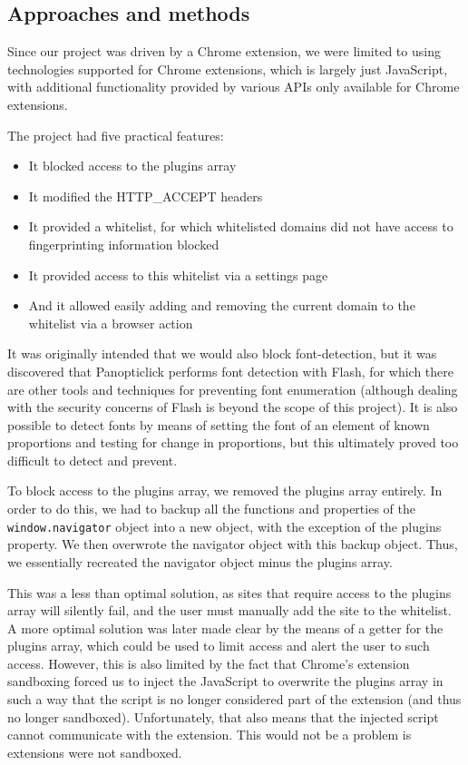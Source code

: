 \documentclass[12pt,a4paper]{article}
\begin{document}
\subsection{Approaches and methods}
Since our project was driven by a Chrome extension, we were limited to using technologies supported for Chrome extensions, which is largely just JavaScript, with additional functionality provided by various APIs only available for Chrome extensions.

The project had five practical features:
\begin{itemize}
	\item It blocked access to the plugins array
	\item It modified the HTTP\_ACCEPT headers
	\item It provided a whitelist, for which whitelisted domains did not have access to fingerprinting information blocked
	\item It provided access to this whitelist via a settings page
	\item And it allowed easily adding and removing the current domain to the whitelist via a browser action
\end{itemize}

It was originally intended that we would also block font-detection, but it was discovered that Panopticlick performs font detection with Flash, for which there are other tools and techniques for preventing font enumeration (although dealing with the security concerns of Flash is beyond the scope of this project). It is also possible to detect fonts by means of setting the font of an element of known proportions and testing for change in proportions, but this ultimately proved too difficult to detect and prevent.

To block access to the plugins array, we removed the plugins array entirely. In order to do this, we had to backup all the functions and properties of the \texttt{window.navigator} object into a new object, with the exception of the plugins property. We then overwrote the navigator object with this backup object. Thus, we essentially recreated the navigator object minus the plugins array.

This was a less than optimal solution, as sites that require access to the plugins array will silently fail, and the user must manually add the site to the whitelist. A more optimal solution was later made clear by the means of a getter for the plugins array, which could be used to limit access and alert the user to such access. However, this is also limited by the fact that Chrome's extension sandboxing forced us to inject the JavaScript to overwrite the plugins array in such a way that the script is no longer considered part of the extension (and thus no longer sandboxed). Unfortunately, that also means that the injected script cannot communicate with the extension. This would not be a problem is extensions were not sandboxed.
\end{document}
